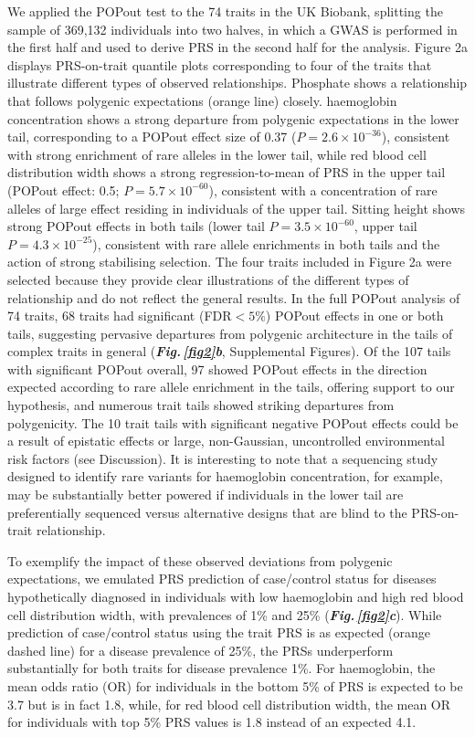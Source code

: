 \documentclass[12pt]{zHenriquesLab-StyleBioRxiv}
\newcommand\dref[2]{\normalsize{\textbf{\textit{Fig.\,\ref{#1}#2}}}\normalsize{}}
\begin{document}
%
We applied the POPout test to the 74 traits in the UK Biobank, 
splitting the sample of 369,132 individuals into two halves, 
in which a GWAS is performed in the first half and used to derive 
PRS in the second half for the analysis. 
Figure 2a  displays PRS-on-trait quantile plots corresponding 
to four of the traits that illustrate different types of 
observed relationships. Phosphate shows a relationship that 
follows polygenic expectations (orange line) closely. 
haemoglobin concentration shows a strong departure from 
polygenic expectations in the lower tail, corresponding 
to a POPout effect size of 0.37 ($P = 2.6 \times 10^{-36}$), 
consistent with strong enrichment of rare alleles in the lower 
tail, while red blood cell distribution width shows a strong 
regression-to-mean of PRS in the upper tail (POPout effect: 
0.5; $P = 5.7 \times 10^{-60}$), consistent with a concentration
of rare alleles of large effect residing in individuals of 
the upper tail. Sitting height shows strong POPout effects in both 
tails (lower tail $P = 3.5 \times 10^{-60}$, upper 
tail $P = 4.3 \times 10^{-25}$), consistent with rare allele 
enrichments in both tails and the action of strong 
stabilising selection. The four traits included in Figure 2a 
were selected because they provide clear illustrations 
of the different types of relationship and do not reflect 
the general results. In the full POPout analysis of 74 traits, 
68 traits had significant (FDR$<5\%$) POPout effects in one or both 
tails, suggesting pervasive departures from polygenic 
architecture in the tails of complex traits in 
general (\dref{fig2}{b}, Supplemental Figures). Of the 107 tails with significant 
POPout overall, 97 showed POPout effects in the 
direction expected according to rare allele enrichment 
in the tails, offering support to our hypothesis, and 
numerous trait tails showed striking departures from polygenicity. 
The 10 trait tails with significant negative POPout effects 
could be a result of epistatic effects or large, non-Gaussian, 
uncontrolled environmental risk factors (see Discussion). 
It is interesting to note that a sequencing study designed 
to identify rare variants for haemoglobin concentration, 
for example, may be substantially better powered if 
individuals in the lower tail are preferentially sequenced 
versus alternative designs that are blind to the PRS-on-trait 
relationship.

To exemplify the impact of these observed deviations from 
polygenic expectations, we emulated PRS prediction of 
case/control status for diseases hypothetically diagnosed 
in individuals with low haemoglobin and high red blood cell 
distribution width, with prevalences of 1\% and 25\% (\dref{fig2}{c}). 
While prediction of case/control status using the trait PRS 
is as expected (orange dashed line) for a disease prevalence 
of 25\%, the PRSs underperform substantially for both 
traits for disease prevalence 1\%. For haemoglobin, the mean 
odds ratio (OR) for individuals in the bottom 5\% of PRS is 
expected to be 3.7 but is in fact 1.8, while, for red blood 
cell distribution width, the mean OR for individuals 
with top 5\% PRS values is 1.8 instead of an expected 4.1.
%
\end{document}
